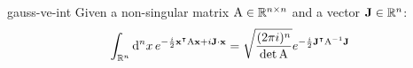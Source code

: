 \begin{lemma}{}{gauss-ve-int}
  Given a non-singular matrix $ \mathrm{A} \in \mathbb{R}^{n \times n} $ and a vector $ \mathbf{J} \in \mathbb{R}^n $:
  \begin{equation}
    \int_{\mathbb{R}^n} \mathrm{d}^nx\, e^{-\frac{i}{2} \mathbf{x}^\intercal \mathrm{A} \mathbf{x} + i \mathbf{J} \cdot \mathbf{x}} = \sqrt{\frac{(2\pi i)^n}{\det\mathrm{A}}} e^{-\frac{i}{2} \mathbf{J}^\intercal \mathrm{A}^{-1} \mathbf{J}}
  \end{equation}
\end{lemma}










